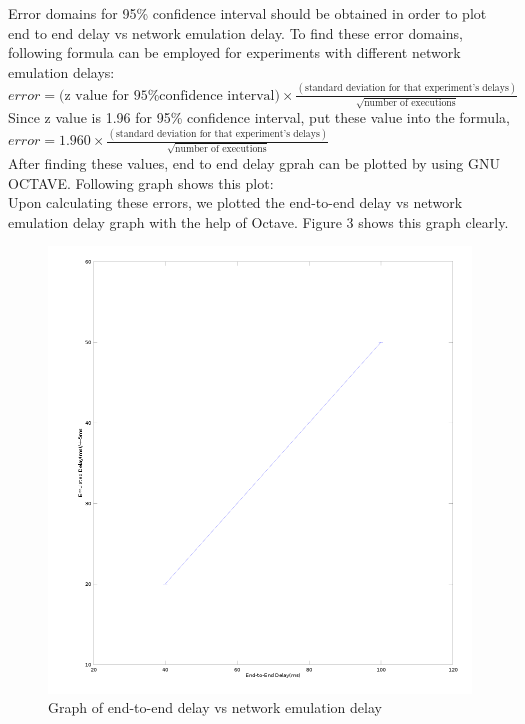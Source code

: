 \documentclass[conference]{IEEEtran}
\begin{document}
Error domains for 95\% confidence interval should be obtained in order to plot end to end delay vs network emulation delay. To find these error domains, following formula can be employed for experiments with different network emulation delays: \\

$error = (\text{z value for 95\% confidence interval)} \times \frac{(\text{standard deviation for that experiment's delays})}{\sqrt{\text{number of executions}}} $\\

Since z value is 1.96 for 95\% confidence interval, put these value into the formula,\\

$error = 1.960 \times \frac{(\text{standard deviation for that experiment's delays})}{\sqrt{\text{number of executions}}} $\\

After finding these values, end to end delay gprah can be plotted by using GNU OCTAVE. Following graph shows this plot:\\

Upon calculating these errors, we plotted the end-to-end delay vs network emulation delay graph with the help of Octave. Figure 3 shows this graph clearly. 

\begin{figure}[h]
    \centering
    \includegraphics[scale=0.4]{graph.png}
    \caption{Graph of end-to-end delay vs network emulation delay}
\end{figure}
\end{document}
